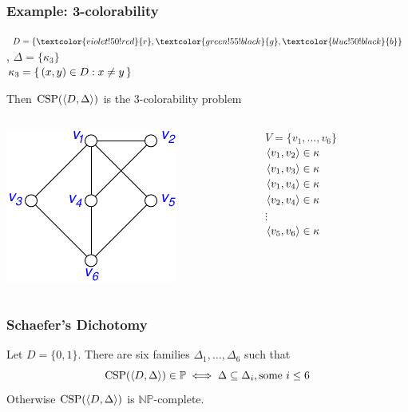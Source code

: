 \documentclass[12pt,xcolor=dvipsnames,handout
   ]{beamer}
\DeclareMathOperator{\CSP}{CSP}
\renewcommand{\.}{\cdot}
\newcommand{\NP}{\ensuremath{\mathbb{NP}}\xspace}
\renewcommand{\P}{\ensuremath{\mathbb{P}}\xspace}
\newcommand{\Blue}{\textcolor{blue!50!black}}
\newcommand{\Red}{\textcolor{violet!50!red}}
\newcommand{\Green}{\textcolor{green!55!black}}
\begin{document}
\begin{frame}
  \frametitle{Example: 3-colorability}

  $D=\{\Red{r},\Green{g},\Blue{b}\}$, $\Delta=\{\kappa_3\}$\\
  $\kappa_3=\left\{\,(x,y)\in D : x\neq y\,\right\}$

  Then $\CSP(\<D,\Delta\>)$ is the 3-colorability problem

  \bigskip

    \begin{columns}
      \begin{column}{1.5in}
        \includegraphics{col_csp}
      \end{column}
      \begin{column}{2in}
        $V=\{v_1,\dots,v_6\}$\\
        $\langle v_1,v_2\rangle\in \kappa$\\
        $\langle v_1,v_3\rangle\in \kappa$\\
        $\langle v_1,v_4\rangle\in \kappa$\\
        $\langle v_2,v_4\rangle\in \kappa$\\
        \qquad$\vdots$\\
        $\langle v_5,v_6\rangle\in \kappa$
      \end{column}
    \end{columns}
  \end{frame}

\begin{frame}
  \frametitle{Schaefer's Dichotomy}

  \begin{theorem}
    Let $D=\{0,1\}$. There are six families $\Delta_1,
  \dots, \Delta_6$ such that
  \begin{equation*}
    \CSP(\<D,\Delta\>) \in \P \iff \Delta \sseq \Delta_i, \text{some $i\leq 6$}
  \end{equation*}
  Otherwise $\CSP(\<D,\Delta\>)$ is $\NP$-complete.
\end{theorem}
\end{frame}
\end{document}
